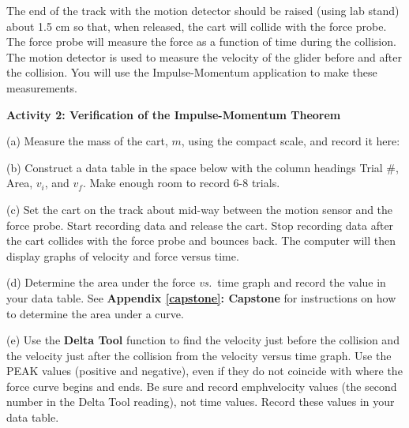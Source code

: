 The end of the track with the motion detector should be raised (using lab stand) 
about 1.5 cm so that, when released, the cart will collide with the force probe. 
The force probe will measure the force as a function of time during the collision. 
The motion detector is used to measure the velocity of the glider before and after the 
collision. You will use the Impulse-Momentum application to make these measurements.

\vspace{0.3cm}
{\par\centering {} \par}
\vspace{0.3cm}

\textbf{Activity 2: Verification of the Impulse-Momentum Theorem} 

(a) Measure the mass of the cart, $m$, using the compact scale, and record it here:
\vspace{10mm}

(b) Construct a data table in the space below with the column headings Trial
\#, Area, \( v_{i} \), and \( v_{f} \). Make enough room to record 6-8 trials.

\newpage


(c) Set the cart on the track about mid-way between the motion sensor and the force probe. Start recording data and release the cart. Stop recording data after the cart collides with the force probe and bounces back. The computer will then display graphs of velocity and force versus time.

(d) Determine the area under the force \textit{vs.}~time graph and record the value in
your data table. See \textbf{Appendix \ref{capstone}: Capstone} for instructions on how to determine the area under a curve.

(e) Use the \textbf{Delta Tool} function to find the velocity just before the collision and the
velocity just after the collision from the velocity versus time graph. Use the 
PEAK values (positive and negative), even if they do not coincide with where 
the force curve begins and ends. Be sure and record emph{velocity} values 
(the second number in the Delta Tool reading), not time values. 
Record these values in your data table.

